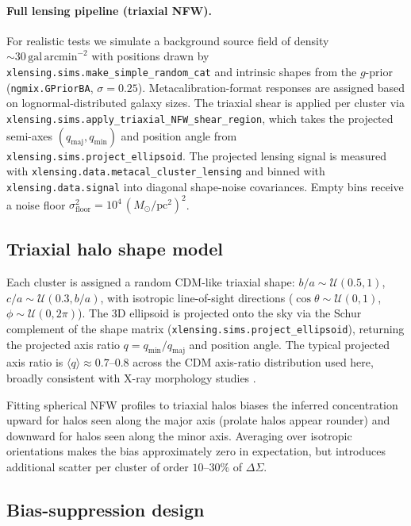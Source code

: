 \documentclass[12pt,a4paper]{article}
\begin{document}
\paragraph{Full lensing pipeline (triaxial NFW).}
For realistic tests we simulate a background source field of density
$\sim30\,\mathrm{gal\,arcmin}^{-2}$ with positions drawn by
\texttt{xlensing.sims.make\_simple\_random\_cat} and intrinsic shapes from the
\citet{MillerBA2013} $g$-prior (\texttt{ngmix.GPriorBA}, $\sigma=0.25$).
Metacalibration-format responses \citep{Sheldon2017,Huff2017} are assigned
based on lognormal-distributed galaxy sizes.
The triaxial shear is applied per cluster via
\texttt{xlensing.sims.apply\_triaxial\_NFW\_shear\_region}, which takes the
projected semi-axes $(q_\mathrm{maj}, q_\mathrm{min})$ and position angle
from \texttt{xlensing.sims.project\_ellipsoid}.
The projected lensing signal is measured with
\texttt{xlensing.data.metacal\_cluster\_lensing} and binned with
\texttt{xlensing.data.signal} into diagonal shape-noise covariances.
Empty bins receive a noise floor $\sigma^2_\mathrm{floor}=10^4\,(M_\odot/\mathrm{pc}^2)^2$.

\subsection{Triaxial halo shape model}

Each cluster is assigned a random CDM-like triaxial shape:
$b/a \sim \mathcal{U}(0.5, 1)$, $c/a \sim \mathcal{U}(0.3, b/a)$, with
isotropic line-of-sight directions ($\cos\theta\sim\mathcal{U}(0,1)$,
$\phi\sim\mathcal{U}(0, 2\pi)$).  The 3D ellipsoid is projected onto the sky
via the Schur complement of the shape matrix
(\texttt{xlensing.sims.project\_ellipsoid}), returning the projected axis ratio
$q=q_\mathrm{min}/q_\mathrm{maj}$ and position angle.  The typical projected
axis ratio is $\langle q\rangle\approx0.7$--$0.8$ across the CDM axis-ratio
distribution used here, broadly consistent with X-ray morphology studies
\citep{Kawahara2010,Sereno2018}.

Fitting spherical NFW profiles to triaxial halos biases the inferred concentration
upward for halos seen along the major axis (prolate halos appear rounder) and
downward for halos seen along the minor axis.  Averaging over isotropic orientations
makes the bias approximately zero in expectation, but introduces additional scatter
per cluster of order $10$--$30\%$ of $\Delta\Sigma$.

\subsection{Bias-suppression design}
\end{document}
